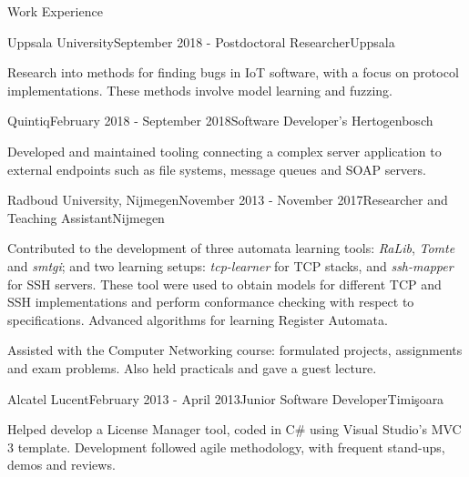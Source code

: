 \documentclass{resume} %
\newcommand{\plang}[1]{$($#1$)$}
\renewcommand{\plang}[1]{}
\begin{document}
\begin{rSection}{Work Experience}
\item \begin{rSubsection}{Uppsala University}{September 2018 - }{Postdoctoral Researcher}{Uppsala}
\item Research into methods for finding bugs in IoT software, with a focus on protocol implementations. These methods involve model learning and fuzzing. 
\end{rSubsection}

\item \begin{rSubsection}{Quintiq}{February 2018 - September 2018}{Software Developer}{'s Hertogenbosch}
\item Developed and maintained tooling connecting a complex server application to external endpoints such as file systems, message queues and SOAP servers. 
\end{rSubsection}

\item \begin{rSubsection}{Radboud University, Nijmegen}{November 2013 - November 2017}{Researcher and Teaching Assistant}{Nijmegen}
\item Contributed to the development of three automata learning tools: \emph{RaLib}\plang{Java}, \emph{Tomte}\plang{Java, Python} and \emph{smtgi}\plang{Python}; and
two learning setups: \emph{tcp-learner}\plang{Java, Python} for TCP stacks, and \emph{ssh-mapper}\plang{Java, Python} for SSH servers. These tool were used to obtain models for different TCP and SSH implementations and perform conformance checking with respect to specifications. Advanced algorithms for learning Register Automata.
\item Assisted with the Computer Networking course: formulated projects, assignments and exam problems. Also held practicals and gave a guest lecture.
\end{rSubsection}



\begin{rSubsection}{Alcatel Lucent}{February 2013 - April 2013}{Junior Software Developer}{Timi\c{s}oara}
\item Helped develop a License Manager tool, coded in C\# using Visual Studio's MVC 3 template. Development followed agile methodology, with frequent stand-ups, demos and reviews.
\end{rSubsection}




\end{rSection}
\end{document}
